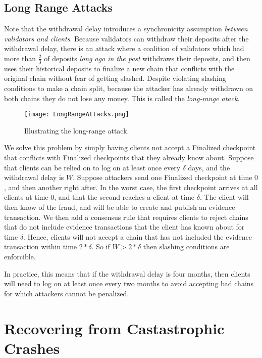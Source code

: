 \documentclass[12pt]{article}
\begin{document}
\subsection{Long Range Attacks}

Note that the withdrawal delay introduces a synchronicity assumption \textit{between validators and clients}. Because validators can withdraw their deposits after the withdrawal delay, there is an attack where a coalition of validators which had more than $\frac{2}{3}$ of deposits \textit{long ago in the past} withdraws their deposits, and then uses their historical deposits to finalize a new chain that conflicts with the original chain without fear of getting slashed.  Despite violating slashing conditions to make a chain split, because the attacker has already withdrawn on both chains they do not lose any money. This is called the \textit{long-range atack}.

\begin{figure}[h!tb]
\centering
\texttt{[image: LongRangeAttacks.png]}
\caption{Illustrating the long-range attack.}
\label{fig:dynamic3}
\end{figure}

We solve this problem by simply having clients not accept a Finalized checkpoint that conflicts with Finalized checkpoints that they already know about. Suppose that clients can be relied on to log on at least once every $\delta$ days, and the withdrawal delay is $W$. Suppose attackers send one Finalized checkpoint at time $0$, and then another right after. In the worst case, the first checkpoint arrives at all clients at time $0$, and that the second reaches a client at time $\delta$. The client will then know of the fraud, and will be able to create and publish an evidence transaction. We then add a consensus rule that requires clients to reject chains that do not include evidence transactions that the client has known about for time $\delta$. Hence, clients will not accept a chain that has not included the evidence transaction within time $2 * \delta$. So if $W > 2 * \delta$ then slashing conditions are enforcible.

In practice, this means that if the withdrawal delay is four months, then clients will need to log on at least once every two months to avoid accepting bad chains for which attackers cannot be penalized. 

\section{Recovering from Castastrophic Crashes}
\label{sect:leak}
\end{document}
